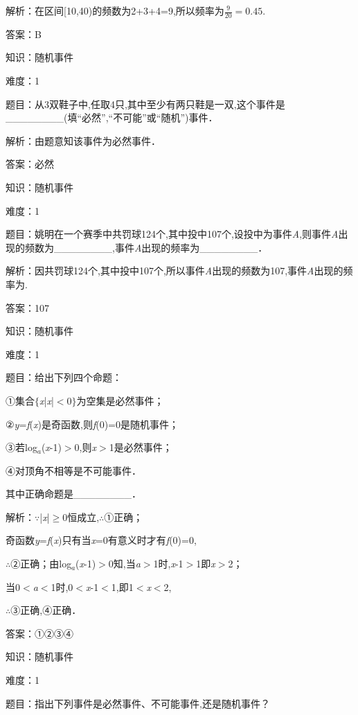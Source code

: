\documentclass{article} %
\begin{document}
解析：在区间[10,40)的频数为2+3+4=9,所以频率为$\frac{9}{20}=0.45$.

答案：B

知识：随机事件

难度：1

题目：从3双鞋子中,任取4只,其中至少有两只鞋是一双,这个事件是\_\_\_\_\_\_\_\_(填``必然'',``不可能''或``随机'')事件．

解析：由题意知该事件为必然事件．

答案：必然

知识：随机事件

难度：1

题目：姚明在一个赛季中共罚球124个,其中投中107个,设投中为事件\textit{A},则事件\textit{A}出现的频数为\_\_\_\_\_\_\_\_,事件\textit{A}出现的频率为\_\_\_\_\_\_\_\_．

解析：因共罚球124个,其中投中107个,所以事件\textit{A}出现的频数为107,事件\textit{A}出现的频率为.

答案：107　

知识：随机事件

难度：1

题目：给出下列四个命题：

①集合$\mathrm{\{}$\textit{x}|\textit{x}|$\mathrm{<}$0$\mathrm{\}}$为空集是必然事件；

②\textit{y}=\textit{f}(\textit{x})是奇函数,则\textit{f}(0)=0是随机事件；

③若log\textit{${}_{a}$}(\textit{x}-1)$\mathrm{>}$0,则\textit{x}$\mathrm{>}$1是必然事件；

④对顶角不相等是不可能事件．

其中正确命题是\_\_\_\_\_\_\_\_．

解析：$\mathrm{\because}$|\textit{x}|$\mathrm{\ge}$0恒成立,$\mathrm{\therefore}$①正确；

奇函数\textit{y}=\textit{f}(\textit{x})只有当\textit{x}=0有意义时才有\textit{f}(0)=0,

$\mathrm{\therefore}$②正确；由log\textit{${}_{a}$}(\textit{x}-1)$\mathrm{>}$0知,当\textit{a}$\mathrm{>}$1时,\textit{x}-1$\mathrm{>}$1即\textit{x}$\mathrm{>}$2；

当0$\mathrm{<}$\textit{a}$\mathrm{<}$1时,0$\mathrm{<}$\textit{x}-1$\mathrm{<}$1,即1$\mathrm{<}$\textit{x}$\mathrm{<}$2,

$\mathrm{\therefore}$③正确,④正确．

答案：①②③④

知识：随机事件

难度：1

题目：指出下列事件是必然事件、不可能事件,还是随机事件？
\end{document}
